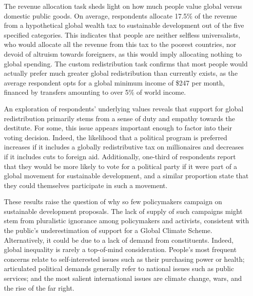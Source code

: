 \documentclass[12pt,english]{article}
\begin{document}
\begin{bibunit}
The revenue allocation task sheds light on how much people value global versus domestic public goods. On average, respondents allocate 17.5\% of the revenue from a hypothetical global wealth tax to sustainable development out of the five specified categories. 
This indicates that people are neither selfless universalists, who would allocate all the revenue from this tax to the poorest countries, nor devoid of altruism towards foreigners, as this would imply allocating nothing to global spending. 
The custom redistribution task confirms that most people would actually prefer much greater global redistribution than currently exists, as the average respondent opts for a global minimum income of \$247 per month, financed by transfers amounting to over 5\% of world income. 

An exploration of respondents' underlying values reveals that support for global redistribution primarily stems from a sense of duty and empathy towards the destitute. For some, this issue appears important enough to factor into their voting decision. Indeed, the likelihood that a political program is preferred increases if it includes a globally redistributive tax on millionaires and decreases if it includes cuts to foreign aid. Additionally, one-third of respondents report that they would be more likely to vote for a political party if it were part of a global movement for sustainable development, and a similar proportion state that they could themselves participate in such a movement. 

These results raise the question of why so few policymakers campaign on sustainable development proposals. The lack of supply of such campaigns might stem from pluralistic ignorance among policymakers and activists, consistent with the public's underestimation of support for a Global Climate Scheme. %
Alternatively, it could be due to a lack of demand from constituents. Indeed, global inequality is rarely a top-of-mind consideration. People's most frequent concerns relate to self-interested issues such as their purchasing power or health; articulated political demands generally refer to national issues such as public services; and the most salient international issues are climate change, wars, and the rise of the far right. %


\end{bibunit}
\end{document}
